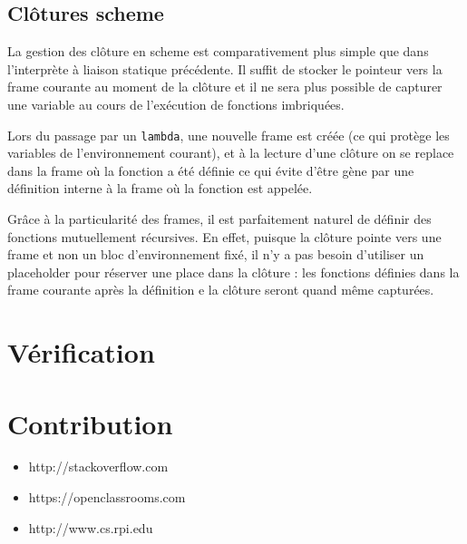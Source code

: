 \documentclass[a4paper,11pt]{article}
\begin{document}
\subsection{Clôtures scheme}

La gestion des clôture en scheme est comparativement plus simple que dans
l'interprète à liaison statique précédente. Il suffit de stocker le pointeur
vers la frame courante au moment de la clôture et il ne sera plus possible de
capturer une variable au cours de l'exécution de fonctions imbriquées.

Lors du passage par un \texttt{lambda}, une nouvelle frame est créée (ce qui
protège les variables de l'environnement courant), et à la lecture d'une clôture
on se replace dans la frame où la fonction a été définie ce qui évite d'être
gène par une définition interne à la frame où la fonction est appelée.

Grâce à la particularité des frames, il est parfaitement naturel de définir des
fonctions mutuellement récursives. En effet, puisque la clôture pointe vers une
frame et non un bloc d'environnement fixé, il n'y a pas besoin d'utiliser un
placeholder pour réserver une place dans la clôture : les fonctions définies
dans la frame courante après la définition e la clôture seront quand même
capturées.

\section{Vérification}

\section{Contribution}




\begin{itemize}
\item http://stackoverflow.com
\item https://openclassrooms.com
\item http://www.cs.rpi.edu
\end{itemize}
\end{document}
